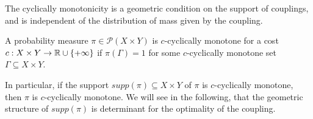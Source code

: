 \documentclass[../main.tex]{subfiles}
\begin{document}
\begin{remark}
    The cyclically monotonicity is a geometric condition on the support of couplings, and is independent of the distribution of mass given by the coupling.
\end{remark}


\begin{definition}
    A probability measure $\pi\in\mathcal{P}(X\times Y)$ is $c$-cyclically monotone for a cost $c:X\times Y\to\mathbb{R}\cup\{+\infty\}$ if $\pi(\Gamma)=1$ for some $c$-cyclically monotone set $\Gamma\subseteq X\times Y$.
\end{definition}

\begin{remark}
    In particular, if the support $supp(\pi)\subseteq X\times Y$ of $\pi$ is $c$-cyclically monotone, then $\pi$ is $c$-cyclically monotone. We will see in the following, that the geometric structure of $supp(\pi)$ is determinant for the optimality of the coupling.
\end{remark}
\end{document}
